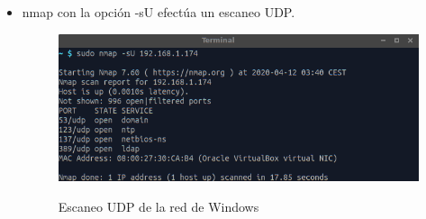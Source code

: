 \documentclass[10pt,a4paper]{article}
\begin{document}
\begin{enumerate}[label=\textbf{\alph*)}]
\begin{itemize}
\item nmap con la opción -sU efectúa un escaneo UDP.
\begin{figure}[h!]
  \centering
  \includegraphics[scale=0.4]{k5.png}\\
  \caption{Escaneo UDP de la red de Windows}
  \label{fig:nmap5}
\end{figure}


\end{itemize}
\end{enumerate}
\end{document}
